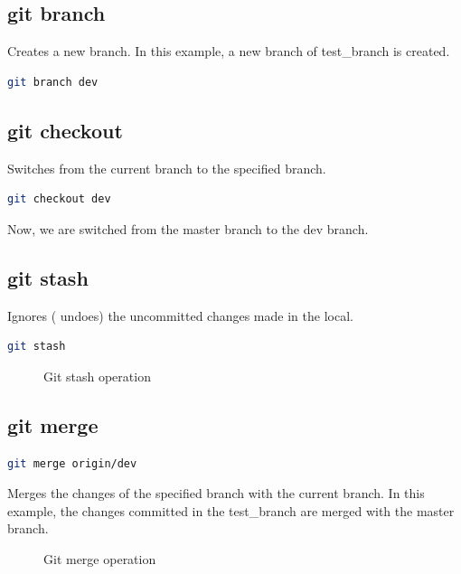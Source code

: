 \documentclass[letterpaper]{article}
\begin{document}
\subsection{git branch}
Creates a new branch. In this example, a new branch of test\_branch is created. 

\begin{lstlisting}[language=Bash]
git branch dev
\end{lstlisting}

\subsection{git checkout}
Switches from the current branch to the specified branch.

\begin{lstlisting}[language=Bash]
git checkout dev
\end{lstlisting}

Now, we are switched from the master branch to the dev branch.


\subsection{git stash}
Ignores ( undoes) the uncommitted changes made in the local.
\begin{lstlisting}[language=Bash]
git stash
\end{lstlisting}

\begin{figure}[h]
    \centering
    \caption{Git stash operation}
  \end{figure}

\subsection{git merge}
\begin{lstlisting}[language=Bash]
git merge origin/dev
\end{lstlisting}
Merges the changes of the specified branch with the current branch. In this example, the changes committed in the test\_branch are merged with the master branch. 

\begin{figure}[h]
    \centering
    \caption{Git merge operation}
  \end{figure}
\end{document}
